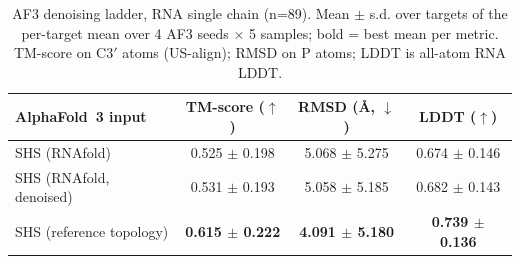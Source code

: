 \begin{table}[htbp]
\centering
\caption{AF3 denoising ladder, RNA single chain (n=89). Mean $\pm$ s.d. over targets of the per-target mean over 4 AF3 seeds $\times$ 5 samples; bold = best mean per metric. TM-score on C3$'$ atoms (US-align); RMSD on P atoms; LDDT is all-atom RNA LDDT.}
\label{tab:denoise_main}
\begin{tabular}{lccc}
\toprule
AlphaFold~3 input & TM-score ($\uparrow$) & RMSD (\AA, $\downarrow$) & LDDT ($\uparrow$) \\
\midrule
SHS (RNAfold) & 0.525 $\pm$ 0.198 & 5.068 $\pm$ 5.275 & 0.674 $\pm$ 0.146 \\
SHS (RNAfold, denoised) & 0.531 $\pm$ 0.193 & 5.058 $\pm$ 5.185 & 0.682 $\pm$ 0.143 \\
SHS (reference topology) & \textbf{0.615 $\pm$ 0.222} & \textbf{4.091 $\pm$ 5.180} & \textbf{0.739 $\pm$ 0.136} \\
\bottomrule
\end{tabular}
\end{table}
